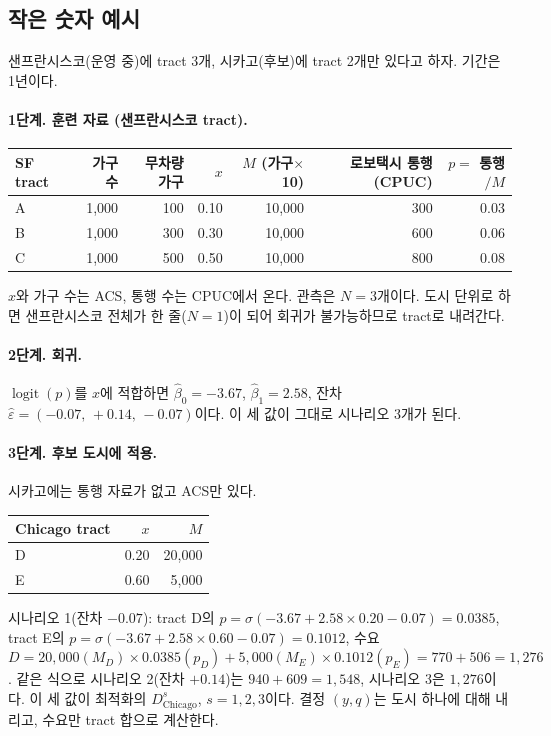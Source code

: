\documentclass[10pt,a4paper]{article}
\DeclareMathOperator{\logit}{logit}
\begin{document}
\subsection{작은 숫자 예시}

샌프란시스코(운영 중)에 tract 3개, 시카고(후보)에 tract 2개만 있다고 하자. 기간은 1년이다.

\paragraph{1단계. 훈련 자료 (샌프란시스코 tract).}
\begin{table}[H]\centering\small
\begin{tabular}{@{}lrrrrrr@{}}
\toprule
SF tract & 가구 수 & 무차량 가구 & $x$ & $M$ (가구$\times$10) & 로보택시 통행 (CPUC) & $p=$ 통행$/M$ \\ \midrule
A & 1{,}000 & 100 & 0.10 & 10{,}000 & 300 & 0.03 \\
B & 1{,}000 & 300 & 0.30 & 10{,}000 & 600 & 0.06 \\
C & 1{,}000 & 500 & 0.50 & 10{,}000 & 800 & 0.08 \\
\bottomrule
\end{tabular}
\end{table}
$x$와 가구 수는 ACS, 통행 수는 CPUC에서 온다. 관측은 $N=3$개이다. 도시 단위로 하면 샌프란시스코 전체가 한 줄($N=1$)이 되어 회귀가 불가능하므로 tract로 내려간다.

\paragraph{2단계. 회귀.} $\logit(p)$를 $x$에 적합하면 $\hat\beta_0=-3.67$, $\hat\beta_1=2.58$, 잔차 $\hat\varepsilon=(-0.07,\,+0.14,\,-0.07)$이다. 이 세 값이 그대로 시나리오 3개가 된다.

\paragraph{3단계. 후보 도시에 적용.} 시카고에는 통행 자료가 없고 ACS만 있다.
\begin{table}[H]\centering\small
\begin{tabular}{@{}lrr@{}}
\toprule
Chicago tract & $x$ & $M$ \\ \midrule
D & 0.20 & 20{,}000 \\
E & 0.60 & 5{,}000 \\
\bottomrule
\end{tabular}
\end{table}
시나리오 1(잔차 $-0.07$): tract D의 $p=\sigma(-3.67+2.58\times0.20-0.07)=0.0385$, tract E의 $p=\sigma(-3.67+2.58\times0.60-0.07)=0.1012$, 수요 $D=20{,}000(M_D)\times0.0385(p_D)+5{,}000(M_E)\times0.1012(p_E)=770+506=1{,}276$. 같은 식으로 시나리오 2(잔차 $+0.14$)는 $940+609=1{,}548$, 시나리오 3은 $1{,}276$이다. 이 세 값이 최적화의 $D_{\text{Chicago}}^{s}$, $s=1,2,3$이다. 결정 $(y,q)$는 도시 하나에 대해 내리고, 수요만 tract 합으로 계산한다.
\end{document}
